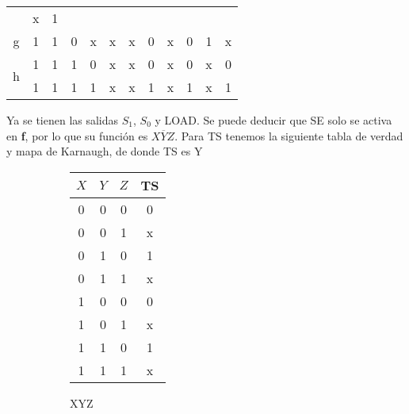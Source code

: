 \begin{table}[H]
\begin{tabular}{c c c c c c c c c c c c}
       & x & 1 %
       \\
    \cmidrule(r){1-6}      \cmidrule(l){7-8} \cmidrule(l){9-10} \cmidrule(l){11-12}
    g  & 1 & 1 & 0 & x & x
       & x & 0 %
       & x & 0 %
       & 1 & x %
       \\
    \cmidrule(r){1-6}      \cmidrule(l){7-8} \cmidrule(l){9-10} \cmidrule(l){11-12}
    \multirow{2}{*}{h}
       & 1 & 1 & 1 & 0 & x
       & x & 0 %
       & x & 0 %
       & x & 0 %
       \\
    \cmidrule(r){2-6}      \cmidrule(l){7-8} \cmidrule(l){9-10} \cmidrule(l){11-12}
       & 1 & 1 & 1 & 1 & x
       & x & 1 %
       & x & 1 %
       & x & 1 %
       \\
    \bottomrule
  \end{tabular}
\end{table}






  Ya se tienen las salidas $S_1$, $S_0$ y LOAD. Se puede deducir que SE solo se activa en \textbf{f}, por lo que su función
  es $X \overline{Y} Z$. Para TS tenemos la siguiente tabla de verdad y mapa de Karnaugh, de donde
  TS es $\text{Y}$
  \begin{figure}[H]
    \begin{subfigure}{0.49\textwidth}
      \centering
      \begin{tabular}{c c c | c}
        \toprule
        $X$ & $Y$ & $Z$ & TS \\ \midrule
        0     & 0     & 0   & 0 \\
        0     & 0     & 1   & x \\
        0     & 1     & 0   & 1 \\
        0     & 1     & 1   & x \\
        1     & 0     & 0   & 0 \\
        1     & 0     & 1   & x \\
        1     & 1     & 0   & 1 \\
        1     & 1     & 1   & x \\
        \bottomrule
      \end{tabular}
    \end{subfigure}
    \begin{subfigure}{0.49\textwidth}
      \centering
      \begin{Karnaughvuit}{X}{Y}{Z}
      \end{Karnaughvuit}
    \end{subfigure}
  \end{figure}


